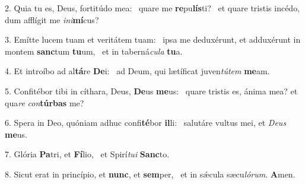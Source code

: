 2. Quia tu es, Deus, fortitúdo mea: \dag\  quare me \textbf{re}pu\textbf{lís}ti? \ast\  et quare tristis incédo, dum afflígit me \textit{in}\textit{i}\textbf{mí}cus?\

3. Emítte lucem tuam et veritátem tuam: \dag\  ipsa me deduxérunt, et adduxérunt in montem \textbf{sanc}tum \textbf{tu}um, \ast\  et in taberná\textit{cu}\textit{la} \textbf{tu}a.\

4. Et introíbo ad al\textbf{tá}re \textbf{De}i: \ast\  ad Deum, qui lætíficat juven\textit{tú}\textit{tem} \textbf{me}am.\

5. Confitébor tibi in cíthara, Deus, \textbf{De}us \textbf{me}us: \ast\  quare tristis es, ánima mea? et qua\textit{re} \textit{con}\textbf{túr}\textbf{bas} me?\

6. Spera in Deo, quóniam adhuc confi\textbf{té}bor \textbf{il}li: \ast\  salutáre vultus mei, et \textit{De}\textit{us} \textbf{me}us.\

7. Glória \textbf{Pa}tri, et \textbf{Fí}lio, \ast\  et Spirí\textit{tu}\textit{i} \textbf{Sanc}to.\

8. Sicut erat in princípio, et \textbf{nunc}, et \textbf{sem}per, \ast\  et in sǽcula sæcu\textit{ló}\textit{rum}. \textbf{A}men.\


